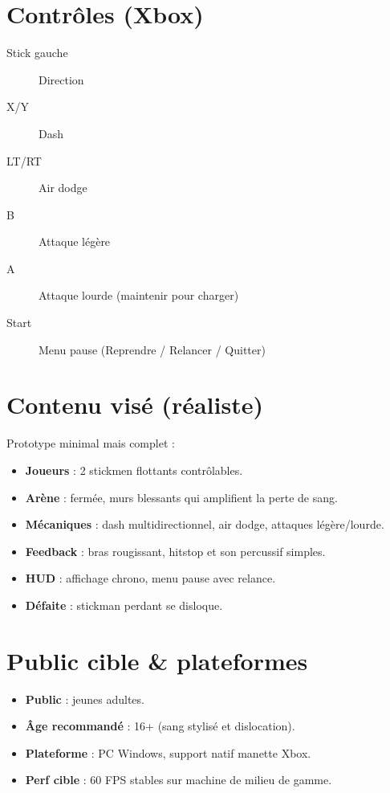 \documentclass[10.8pt,letterpaper]{article}
\begin{document}
\begin{multicols}{2}
\section*{Contrôles (Xbox)}
\begin{description}
  \item[Stick gauche] Direction
  \item[X/Y] Dash
  \item[LT/RT] Air dodge
  \item[B] Attaque légère
  \item[A] Attaque lourde (maintenir pour charger)
  \item[Start] Menu pause (Reprendre / Relancer / Quitter)
\end{description}

\section*{Contenu visé (réaliste)}
Prototype minimal mais complet :  
\begin{itemize}
  \item \textbf{Joueurs} : 2 stickmen flottants contrôlables.
  \item \textbf{Arène} : fermée, murs blessants qui amplifient la perte de sang.
  \item \textbf{Mécaniques} : dash multidirectionnel, air dodge, attaques légère/lourde.
  \item \textbf{Feedback} : bras rougissant, hitstop et son percussif simples.
  \item \textbf{HUD} : affichage chrono, menu pause avec relance.
  \item \textbf{Défaite} : stickman perdant se disloque.
\end{itemize}

\section*{Public cible \& plateformes}
\begin{itemize}
  \item \textbf{Public} : jeunes adultes.
  \item \textbf{Âge recommandé} : 16+ (sang stylisé et dislocation).
  \item \textbf{Plateforme} : PC Windows, support natif manette Xbox.
  \item \textbf{Perf cible} : 60 FPS stables sur machine de milieu de gamme.
\end{itemize}


\end{multicols}
\end{document}
